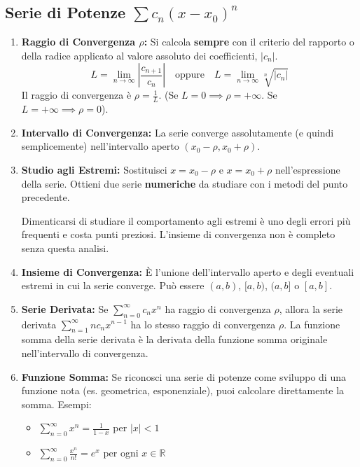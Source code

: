 \subsection{Serie di Potenze $\sum c_n (x-x_0)^n$}
\begin{enumerate}
    \item \textbf{Raggio di Convergenza $\rho$:} Si calcola \textbf{sempre} con il criterio del rapporto o della radice applicato al valore assoluto dei coefficienti, $|c_n|$. 
    \[ L = \lim_{n \to \infty} \left|\frac{c_{n+1}}{c_n}\right| \quad \text{oppure} \quad L = \lim_{n \to \infty} \sqrt[n]{|c_n|} \]
    Il raggio di convergenza è $\rho = \frac{1}{L}$. (Se $L=0 \implies \rho=+\infty$. Se $L=+\infty \implies \rho=0$). 
    \item \textbf{Intervallo di Convergenza:} La serie converge assolutamente (e quindi semplicemente) nell'intervallo aperto $(x_0 - \rho, x_0 + \rho)$. 
    \item \textbf{Studio agli Estremi:} Sostituisci $x = x_0 - \rho$ e $x = x_0 + \rho$ nell'espressione della serie. Ottieni due serie \textbf{numeriche} da studiare con i metodi del punto precedente. 
    \begin{errore}
    Dimenticarsi di studiare il comportamento agli estremi è uno degli errori più frequenti e costa punti preziosi. L'insieme di convergenza non è completo senza questa analisi. 
    \end{errore}
    \item \textbf{Insieme di Convergenza:} È l'unione dell'intervallo aperto e degli eventuali estremi in cui la serie converge. Può essere $(a,b)$, $[a,b)$, $(a,b]$ o $[a,b]$. 
    \item \textbf{Serie Derivata:} Se $\sum_{n=0}^{\infty} c_n x^n$ ha raggio di convergenza $\rho$, allora la serie derivata $\sum_{n=1}^{\infty} n c_n x^{n-1}$ ha lo stesso raggio di convergenza $\rho$. La funzione somma della serie derivata è la derivata della funzione somma originale nell'intervallo di convergenza.
    \item \textbf{Funzione Somma:} Se riconosci una serie di potenze come sviluppo di una funzione nota (es. geometrica, esponenziale), puoi calcolare direttamente la somma. Esempi:
    \begin{itemize}
        \item $\sum_{n=0}^{\infty} x^n = \frac{1}{1-x}$ per $|x| < 1$
        \item $\sum_{n=0}^{\infty} \frac{x^n}{n!} = e^x$ per ogni $x \in \mathbb{R}$
    \end{itemize}
\end{enumerate}

